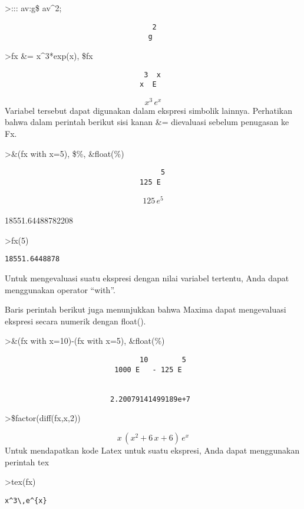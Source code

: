\documentclass[
]{book}
\begin{document}
\textgreater::: av:g\$ av\^{}2;

\begin{verbatim}
                                   2
                                  g
\end{verbatim}

\textgreater fx \&= x\^{}3*exp(x), \$fx

\begin{verbatim}
                                 3  x
                                x  E
\end{verbatim}

\[x^3\,e^{x}\]Variabel tersebut dapat digunakan dalam ekspresi simbolik lainnya. Perhatikan bahwa dalam perintah berikut sisi kanan \&= dievaluasi sebelum penugasan ke Fx.

\textgreater\&(fx with x=5), \$\%, \&float(\%)

\begin{verbatim}
                                     5
                                125 E
\end{verbatim}

\[125\,e^5\]\\
18551.64488782208

\textgreater fx(5)

\begin{verbatim}
18551.6448878
\end{verbatim}

Untuk mengevaluasi suatu ekspresi dengan nilai variabel tertentu, Anda dapat menggunakan operator ``with''.

Baris perintah berikut juga menunjukkan bahwa Maxima dapat mengevaluasi ekspresi secara numerik dengan float().

\textgreater\&(fx with x=10)-(fx with x=5), \&float(\%)

\begin{verbatim}
                                10        5
                          1000 E   - 125 E


                         2.20079141499189e+7
\end{verbatim}

\textgreater\$factor(diff(fx,x,2))

\[x\,\left(x^2+6\,x+6\right)\,e^{x}\]Untuk mendapatkan kode Latex untuk suatu ekspresi, Anda dapat menggunakan perintah tex

\textgreater tex(fx)

\begin{verbatim}
x^3\,e^{x}
\end{verbatim}
\end{document}
